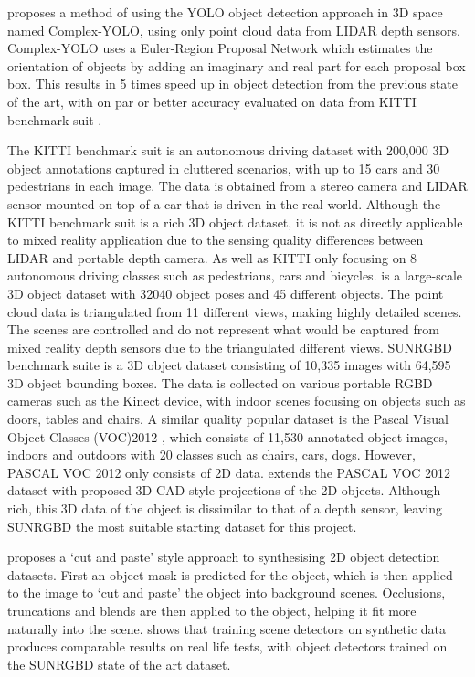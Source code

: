 \documentclass[11pt]{article}
\begin{document}
\cite{complex_YOLO} proposes a method of using the YOLO object detection approach in 3D space named Complex-YOLO, using only point cloud data from LIDAR depth sensors. Complex-YOLO uses a Euler-Region Proposal Network which estimates the orientation of objects by adding an imaginary and real part for each proposal box box. This results in 5 times speed up in object detection from the previous state of the art, with on par or better accuracy evaluated on data from KITTI benchmark suit \cite{KITTI}. 

The KITTI benchmark suit is an autonomous driving dataset with 200,000 3D object annotations captured in cluttered scenarios, with up to 15 cars and 30 pedestrians in each image. The data is obtained from a stereo camera and LIDAR sensor mounted on top of a car that is driven in the real world. Although the KITTI benchmark suit is a rich 3D object dataset, it is not as directly applicable to mixed reality application due to the sensing quality differences between LIDAR and portable depth camera. As well as KITTI only focusing on 8 autonomous driving classes such as pedestrians, cars and bicycles. \cite{3D_dataset} is a large-scale 3D object dataset with 32040 object poses and 45 different objects. The point cloud data is triangulated from 11 different views, making highly detailed scenes. The scenes are controlled and do not represent what would be captured from mixed reality depth sensors due to the triangulated different views. SUNRGBD benchmark suite \cite{SUNRGBD} is a 3D object dataset consisting of 10,335 images with 64,595 3D object bounding boxes. The data is collected on various portable RGBD cameras such as the Kinect device, with indoor scenes focusing on objects such as doors, tables and chairs. A similar quality popular dataset is the Pascal Visual Object Classes (VOC)2012 \cite{pascal-voc-2012}, which consists of 11,530 annotated object images, indoors and outdoors with 20 classes such as chairs, cars, dogs. However, PASCAL VOC 2012 only consists of 2D data. \cite{PASCAL_3D} extends the PASCAL VOC 2012 dataset with proposed 3D CAD style projections of the 2D objects. Although rich, this 3D data of the object is dissimilar to that of a depth sensor, leaving SUNRGBD the most suitable starting dataset for this project.

\cite{cut_paste} proposes a `cut and paste' style approach to synthesising 2D object detection datasets. First an object mask is predicted for the object, which is then applied to the image to `cut and paste' the object into background scenes. Occlusions, truncations and blends are then applied to the object, helping it fit more naturally into the scene. \cite{synthetic_train} shows that training scene detectors on synthetic data produces comparable results on real life tests, with object detectors trained on the SUNRGBD state of the art dataset.
\end{document}
